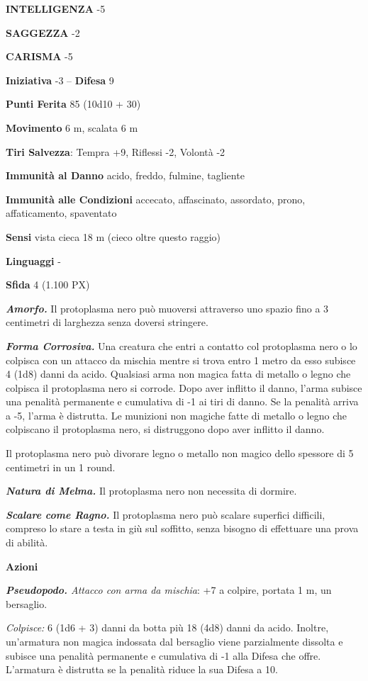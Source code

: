 \begin{multicols}{2}
\textbf{INTELLIGENZA} -5

\textbf{SAGGEZZA} -2

\textbf{CARISMA} -5

\textbf{Iniziativa} -3 -- \textbf{Difesa} 9

\textbf{Punti Ferita} 85 (10d10 + 30)

\textbf{Movimento} 6 m, scalata 6 m

\textbf{Tiri Salvezza}: Tempra +9, Riflessi -2, Volontà -2

\textbf{Immunità al Danno} acido, freddo, fulmine, tagliente

\textbf{Immunità alle Condizioni} accecato, affascinato, assordato, prono, affaticamento, spaventato

\textbf{Sensi} vista cieca 18 m (cieco oltre questo raggio)

\textbf{Linguaggi} -

\textbf{Sfida} 4 (1.100 PX)

\textit{\textbf{Amorfo.}} Il protoplasma nero può muoversi attraverso uno spazio fino a 3 centimetri di larghezza senza doversi stringere.

\textit{\textbf{Forma Corrosiva.}} Una creatura che entri a contatto col protoplasma nero o lo colpisca con un attacco da mischia mentre si trova entro 1 metro da esso subisce 4 (1d8) danni da acido. Qualsiasi arma non magica fatta di metallo o legno che colpisca il protoplasma nero si corrode. Dopo aver inflitto il danno, l'arma subisce una penalità permanente e cumulativa di -1 ai tiri di danno. Se la penalità arriva a -5, l'arma è distrutta. Le munizioni non magiche fatte di metallo o legno che colpiscano il protoplasma nero, si distruggono dopo aver inflitto il danno.

Il protoplasma nero può divorare legno o metallo non magico dello spessore di 5 centimetri in un 1 round.

\textit{\textbf{Natura di Melma.}} Il protoplasma nero non necessita di dormire.

\textit{\textbf{Scalare come Ragno.}} Il protoplasma nero può scalare superfici difficili, compreso lo stare a testa in giù sul soffitto, senza bisogno di effettuare una prova di abilità.

\textbf{Azioni}

\textit{\textbf{Pseudopodo.} Attacco con arma da mischia}: +7 a colpire, portata 1 m, un bersaglio.

\textit{Colpisce:} 6 (1d6 + 3) danni da botta più 18 (4d8) danni da acido. Inoltre, un'armatura non magica indossata dal bersaglio viene parzialmente dissolta e subisce una penalità permanente e cumulativa di -1 alla Difesa che offre. L'armatura è distrutta se la penalità riduce la sua Difesa a 10.


\end{multicols}
